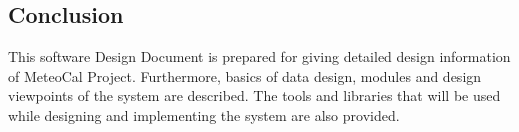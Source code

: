\newpage

\begin{center}
\section{Conclusion}
\end{center}
\qquad This software Design Document is prepared for giving detailed design information of MeteoCal Project. Furthermore, basics of data design, modules and design viewpoints of the system are described. The tools and libraries that will be used while designing and implementing the system are also provided.  